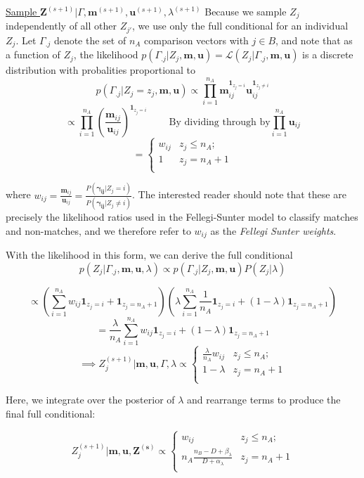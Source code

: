 \documentclass[
  12pt,
]{article}
\begin{document}
\underline{Sample $\mathbf{Z}^{(s+1)}|\Gamma, \mathbf{m}^{(s+1)}, \mathbf{u}^{(s+1)}, \lambda^{(s+1)}$}
Because we sample \(Z_j\) independently of all other \(Z_{j'}\), we use
only the full conditional for an individual \(Z_j\). Let \(\Gamma_{.j}\)
denote the set of \(n_A\) comparison vectors with \(j \in B\), and note
that as a function of \(Z_j\), the likelihood
\(p(\Gamma_{.j}|Z_j, \mathbf{m}, \mathbf{u}) = \mathcal{L}(Z_j|\Gamma_{.j}, \mathbf{m}, \mathbf{u})\)
is a discrete distribution with probalities proportional to
\[p(\Gamma_{.j}|Z_j = z_j, \mathbf{m}, \mathbf{u}) \propto \prod_{i=1}^{n_A}\mathbf{m}_{ij}^{\mathbf{1}_{z_j = i}}\mathbf{u}_{ij}^{\mathbf{1}_{z_j \neq i}}\]
\[\propto \prod_{i=1}^{n_A}\left(\frac{\mathbf{m}_{ij}}{\mathbf{u}_{ij}}\right)^{\mathbf{1}_{z_j = i}} \;\;\;\;\;\;\;\; \text{By dividing through by} \prod_{i = 1}^{n_A}\mathbf{u}_{ij}\]
\[=
\begin{cases} 
    w_{ij}  & z_j \leq n_A; \\
    1 &  z_j  = n_A + 1 \\
\end{cases}\]

where
\(w_{ij} = \frac{\mathbf{m}_{ij}}{\mathbf{u}_{ij}} = \frac{P(\boldsymbol{\gamma_{ij}}|Z_j = i)}{P(\boldsymbol{\gamma_{ij}} |Z_j \neq i)}\).
The interested reader should note that these are precisely the
likelihood ratios used in the Fellegi-Sunter model to classify matches
and non-matches, and we therefore refer to \(w_{ij}\) as the
\emph{Fellegi Sunter weights}.

With the likelihood in this form, we can derive the full conditional
\[p(Z_j|\Gamma_{.j}, \mathbf{m} ,\mathbf{u}, \lambda) \propto p(\Gamma_{.j}| Z_j, \mathbf{m} ,\mathbf{u}) P(Z_j|\lambda)\]

\[\propto \left(\sum_{i=1}^{n_A}w_{ij}\mathbf{1}_{z_j = i} + \mathbf{1}_{z_j = n_A + 1}\right)\left(\lambda\sum_{i=1}^{n_A}\frac{1}{n_A}\mathbf{1}_{z_j = i} + (1-\lambda)\mathbf{1}_{z_j = n_A + 1}\right)\]
\[= \frac{\lambda}{n_A}\sum_{i=1}^{n_A}w_{ij}\mathbf{1}_{z_j = i} + (1-\lambda)\mathbf{1}_{z_j = n_A + 1} \]
\[ \implies Z_j^{(s+1)} | \mathbf{m}, \mathbf{u}, \Gamma, \lambda \propto
\begin{cases} 
    \frac{\lambda}{n_A}w_{ij}   & z_j \leq n_A; \\
     1-\lambda &  z_j  = n_A + 1 \\
\end{cases}\]

Here, we integrate over the posterior of \(\lambda\) and rearrange terms
to produce the final full conditional:

\[Z_j^{(s+1)} | \mathbf{m}, \mathbf{u}, \mathbf{Z^{(s)}} \propto
\begin{cases} 
    w_{ij}  & z_j \leq n_A; \\
     n_A \frac{n_B - D + \beta_{\lambda}}{D + \alpha_{\lambda}} &  z_j  = n_A + 1 \\
\end{cases}\]
\end{document}
